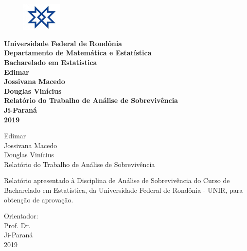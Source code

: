 \documentclass[a4paper, oneside]{book}\usepackage[]{graphicx}\usepackage[]{color}
\begin{document}



\begin{titlepage} %
	\begin{center} %
		\begin{figure}[!htb]
			\includegraphics[width=2cm]{img/unir-logo}
			\centering
		\end{figure}
		{\large \bf Universidade Federal de Rondônia}\\[0.35cm] 
		{\large \bf Departamento de Matemática e Estatística}\\[0.35cm] 
		{\large \bf Bacharelado em Estatística}\\[2.5cm]  
		
		{\large \bf Edimar \\ Jossivana Macedo \\ Douglas Vinícius}\\[5cm]
		{\bf \huge Relatório do Trabalho de Análise de Sobrevivência}\\[9.5cm] %
		{\large \bf Ji-Paraná}\\[0.2cm]
		{\large \bf 2019}
	\end{center}
\end{titlepage}


\begin{titlepage}
	\vfill 
	\begin{center}
		{\large Edimar \\ Jossivana Macedo \\ Douglas Vinícius} \\[5cm]
		{\Huge  Relatório do Trabalho de Análise de Sobrevivência}\\[4.0cm]
		\hspace{.45\textwidth} %
		\begin{minipage}{.45\textwidth}
Relatório apresentado à Disciplina de Análise de Sobrevivência do Curso de Bacharelado em Estatística, da Universidade Federal de Rondônia - UNIR, para obtenção de aprovação.
		\end{minipage}
		\vfill
		{\large Orientador:\\ Prof. Dr. 
		}\\[1.0cm]
		{\large Ji-Paraná}\\[0.2cm]
		{\large 2019}
	\end{center}
\end{titlepage}
\end{document}
